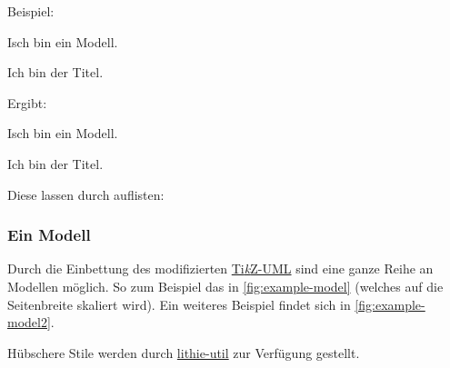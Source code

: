\documentclass{sopra-base}
\begin{document}
Beispiel:
\begin{plainlatex}[morekeywords={[3]{model}}]
\begin{model}
    \centering
    Isch bin ein Modell.
    \caption[Und ich eigentlich kürzer.]{Ich bin der Titel.}
\end{model}
\end{plainlatex}
Ergibt:
\begin{model}
    \centering
    Isch bin ein Modell.
    \caption[Und ich eigentlich kürzer.]{Ich bin der Titel.}
\end{model}

Diese lassen durch  auflisten:

\listofmodel

\subsubsection{Ein Modell}
Durch die Einbettung des modifizierten \href{https://perso.ensta-paris.fr/~kielbasi/tikzuml/}{Ti\textit{k}Z-UML} sind eine ganze Reihe an Modellen möglich. So zum Beispiel das in \autoref{fig:example-model} (welches auf die Seitenbreite skaliert wird). Ein weiteres Beispiel findet sich in \autoref{fig:example-model2}.

Hübschere Stile werden durch \href{https://github.com/EagleoutIce/lithie-util}{lithie-util} zur Verfügung gestellt.
\end{document}
